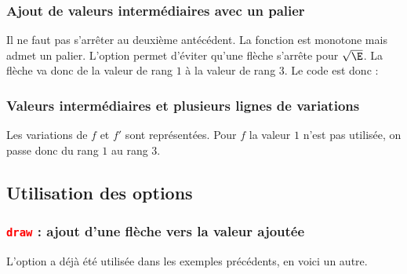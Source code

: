 \subsubsection{Ajout de valeurs intermédiaires  avec un palier} 

Il ne faut pas s'arrêter au deuxième antécédent. La fonction est  monotone mais admet un palier. L'option  permet d'éviter qu'une flèche s'arrête pour $\sqrt\E$. La flèche va donc de la valeur de rang $1$ à la valeur de rang $3$. Le code est donc :
\begin{tkzexample}
\end{tkzexample}

\begin{tkzexample}
\end{tkzexample}


\subsubsection{Valeurs intermédiaires et plusieurs lignes de variations }

Les variations de  $f$ et $f'$ sont représentées. Pour $f$ la valeur $1$ n'est pas utilisée, on passe donc du rang $1$ au rang $3$.

\begin{tkzexample}
\end{tkzexample}
 
\subsection{Utilisation des options}

\subsubsection{\texttt{\textcolor{red}{draw}} : ajout d'une flèche vers la valeur ajoutée}
L'option a déjà été utilisée dans les exemples précédents, en voici un autre. 


